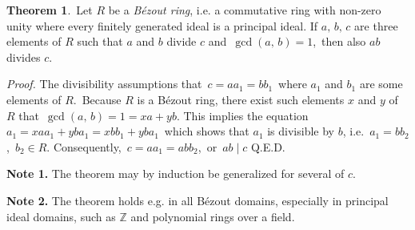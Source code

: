 \documentclass[12pt]{article}
\theoremstyle{definition}
\newtheorem*{thmplain}{Theorem}
\begin{document}
\begin{thmplain}
\,Let $R$ be a {\em B\'ezout ring}, i.e. a commutative ring with non-zero unity where every finitely generated ideal is a principal ideal.  If $a,\,b,\,c$ are three elements of $R$ such that $a$ and $b$ divide $c$ and\, $\gcd(a,\,b) = 1$, \,then also $ab$ divides $c$.
\end{thmplain}

{\em Proof.}  The divisibility assumptions  that\, $c = aa_1 = bb_1$\, where $a_1$ and $b_1$ are some elements of $R$.\, Because $R$ is a B\'ezout ring, there exist such elements $x$ and $y$ of $R$ that \,$\gcd(a,\,b) = 1 = xa+yb$. This implies the equation \,$a_1 = xaa_1+yba_1 = xbb_1+yba_1$\, which shows that $a_1$ is divisible by $b$, i.e.\, $a_1 = bb_2$,\, $b_2\in R$.  Consequently,\, $c = aa_1 = abb_2$,\, or\, $ab \mid c$\; Q.E.D.

\textbf{Note 1.}  The theorem may by induction be generalized for several  of $c$.

\textbf{Note 2.}  The theorem holds e.g. in all B\'ezout domains, especially in principal ideal domains, such as $\mathbb{Z}$ and polynomial rings over a field.
\end{document}
